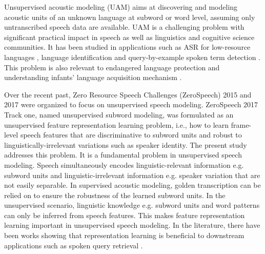 \documentclass[a4paper]{article}
\begin{document}
Unsupervised acoustic modeling (UAM) aims at discovering and modeling acoustic units  of an unknown language at subword or word level, assuming only untranscribed speech data are available.
UAM is a challenging problem with significant practical impact in speech  as well as linguistics and cognitive science communities. It has been studied in applications  such as ASR for low-resource languages \cite{I3EWang}, language identification \cite{li2007vector} and query-by-example spoken term detection \cite{Chen+2016}. This problem is also relevant to
endangered language protection \cite{jansen2013summary} and  understanding infants' language acquisition mechanism \cite{dupoux2016cognitive}. 

Over the recent past, Zero Resource Speech Challenges (ZeroSpeech) 2015 \cite{versteegh2015zero} and 2017 \cite{dunbar2017zero} were organized to focus on unsupervised speech modeling.
ZeroSpeech 2017 Track one, named unsupervised subword modeling,  was formulated as an unsupervised feature representation learning problem, i.e., how to learn frame-level speech features that are discriminative to subword units and robust to linguistically-irrelevant variations such as speaker identity. 
The present study addresses this problem.
It is a fundamental problem in unsupervised speech modeling.
Speech simultaneously encodes linguistic-relevant information e.g. subword units and linguistic-irrelevant information e.g. speaker variation that are not easily separable. In supervised acoustic  modeling, golden transcription can be relied on to ensure the robustness of the learned subword units. In the unsupervised scenario, linguistic knowledge e.g. subword units and word patterns can only be  inferred from speech features. This makes feature representation learning important in unsupervised speech modeling. In the literature, there have been works showing that representation learning is beneficial to downstream applications such as spoken query retrieval \cite{chen2017multitask}.
\end{document}
